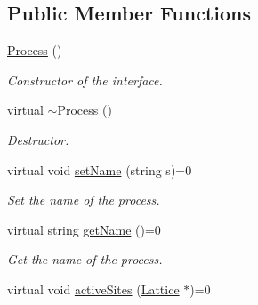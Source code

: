 \subsection*{Public Member Functions}
\begin{DoxyCompactItemize}
\item 
\mbox{\label{classMicroProcesses_1_1Process_ac0ed6a31edbe810d849cff9ab6da1233}} 
\mbox{\hyperlink{classMicroProcesses_1_1Process_ac0ed6a31edbe810d849cff9ab6da1233}{Process}} ()
\begin{DoxyCompactList}\small\item\em Constructor of the interface. \end{DoxyCompactList}\item 
\mbox{\label{classMicroProcesses_1_1Process_a093d6dc68f2e95ad6129623996853863}} 
virtual \mbox{\hyperlink{classMicroProcesses_1_1Process_a093d6dc68f2e95ad6129623996853863}{$\sim$\+Process}} ()
\begin{DoxyCompactList}\small\item\em Destructor. \end{DoxyCompactList}\item 
\mbox{\label{classMicroProcesses_1_1Process_a54c59b0eb502785edd0df976e232aeb1}} 
virtual void \mbox{\hyperlink{classMicroProcesses_1_1Process_a54c59b0eb502785edd0df976e232aeb1}{set\+Name}} (string s)=0
\begin{DoxyCompactList}\small\item\em Set the name of the process. \end{DoxyCompactList}\item 
\mbox{\label{classMicroProcesses_1_1Process_a1933fe53e2545c533ab9de6a094437f9}} 
virtual string \mbox{\hyperlink{classMicroProcesses_1_1Process_a1933fe53e2545c533ab9de6a094437f9}{get\+Name}} ()=0
\begin{DoxyCompactList}\small\item\em Get the name of the process. \end{DoxyCompactList}\item 
\mbox{\label{classMicroProcesses_1_1Process_ae6414c8655f64aa691912db2aec8ad17}} 
virtual void \mbox{\hyperlink{classMicroProcesses_1_1Process_ae6414c8655f64aa691912db2aec8ad17}{active\+Sites}} (\mbox{\hyperlink{classLattice}{Lattice}} $\ast$)=0

\end{DoxyCompactItemize}
